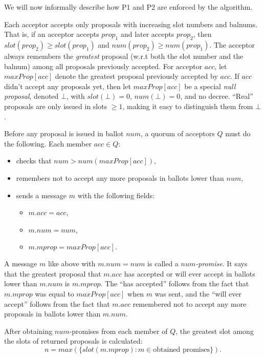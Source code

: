 \documentclass[12pt,a4paper,en]{pracamgr}
\newcommand{\ti}[1]{\textit{#1}}
\begin{document}
We will now informally describe how P1 and P2 are enforced by the algorithm.

Each acceptor accepts only proposals with increasing slot numbers and balnums. That is, if an acceptor accepts $prop_1$ and later accepts $prop_2$, then $slot(prop_2) \ge slot(prop_1)$ and $num(prop_2) \ge num(prop_1)$. The acceptor always remembers the \ti{greatest} proposal (w.r.t both the slot number and the balnum) among all proposals previously accepted. For acceptor $acc$, let $maxProp[acc]$ denote the greatest proposal previously accepted by $acc$. If $acc$ didn't accept any proposals yet, then let $maxProp[acc]$ be a special \ti{null proposal}, denoted $\bot$, with $slot(\bot) = 0$, $num(\bot) = 0$, and no decree. ``Real'' proposals are only issued in slots $\ge 1$, making it easy to distinguish them from $\bot$.

Before any proposal is issued in ballot $num$, a quorum of acceptors $Q$ must do the following. Each member $acc \in Q$:
\begin{itemize}
    \item checks that $num > num(maxProp[acc])$,
    \item remembers not to accept any more proposals in ballots lower than $num$,
    \item sends a message $m$ with the following fields:
        \begin{itemize}
            \item $m.acc = acc$,
            \item $m.num = num$,
            \item $m.mprop = maxProp[acc].$
        \end{itemize}
\end{itemize}
A message $m$ like above with $m.num = num$ is called a \ti{$num$-promise}. It says that the greatest proposal that $m.acc$ has accepted or will ever accept in ballots lower than $m.num$ is $m.mprop$. The ``has accepted'' follows from the fact that $m.mprop$ was equal to $maxProp[acc]$ when $m$ was sent, and the ``will ever accept'' follows from the fact that $m.acc$ remembered not to accept any more proposals in ballots lower than $m.num$.

After obtaining $num$-promises from each member of $Q$, the greatest slot among the slots of returned proposals is calculated:
$$ n = max(\{slot(m.mprop): m \in \text{obtained promises}\}). $$
\end{document}
